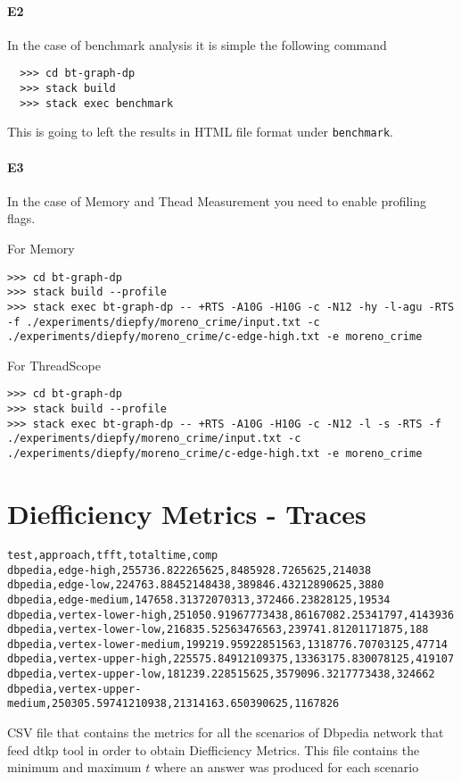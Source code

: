 \paragraph{E2} In the case of benchmark analysis it is simple the following command
\begin{verbatim}
  >>> cd bt-graph-dp
  >>> stack build
  >>> stack exec benchmark
  \end{verbatim}

\setlength{\rightskip}{0pt plus 1 fil}
This is going to left the results in HTML file format under \texttt{benchmark}.


\paragraph{E3} In the case of Memory and Thead Measurement you need to enable profiling flags.

For Memory
\begin{verbatim}
>>> cd bt-graph-dp
>>> stack build --profile
>>> stack exec bt-graph-dp -- +RTS -A10G -H10G -c -N12 -hy -l-agu -RTS -f ./experiments/diepfy/moreno_crime/input.txt -c ./experiments/diepfy/moreno_crime/c-edge-high.txt -e moreno_crime
\end{verbatim}

For ThreadScope
\begin{verbatim}
>>> cd bt-graph-dp
>>> stack build --profile
>>> stack exec bt-graph-dp -- +RTS -A10G -H10G -c -N12 -l -s -RTS -f ./experiments/diepfy/moreno_crime/input.txt -c ./experiments/diepfy/moreno_crime/c-edge-high.txt -e moreno_crime
\end{verbatim}

\section{Diefficiency Metrics - Traces}\label{apx:traces}

\begin{listing}[htp!]
\begin{verbatim}
test,approach,tfft,totaltime,comp
dbpedia,edge-high,255736.822265625,8485928.7265625,214038
dbpedia,edge-low,224763.88452148438,389846.43212890625,3880
dbpedia,edge-medium,147658.31372070313,372466.23828125,19534
dbpedia,vertex-lower-high,251050.91967773438,86167082.25341797,4143936
dbpedia,vertex-lower-low,216835.52563476563,239741.81201171875,188
dbpedia,vertex-lower-medium,199219.95922851563,1318776.70703125,47714
dbpedia,vertex-upper-high,225575.84912109375,13363175.830078125,419107
dbpedia,vertex-upper-low,181239.228515625,3579096.3217773438,324662
dbpedia,vertex-upper-medium,250305.59741210938,21314163.650390625,1167826
\end{verbatim}  
\caption[{[\texttt{metrics.csv}] Metrics CSV Dbpedia}]{CSV file that contains the metrics for all the scenarios of Dbpedia network that feed \acrshort{dtkp} tool in order to obtain Diefficiency Metrics. This file contains the minimum and maximum $t$ where an answer was produced for each scenario}
\label{apx:metrics:csv}
\end{listing}

